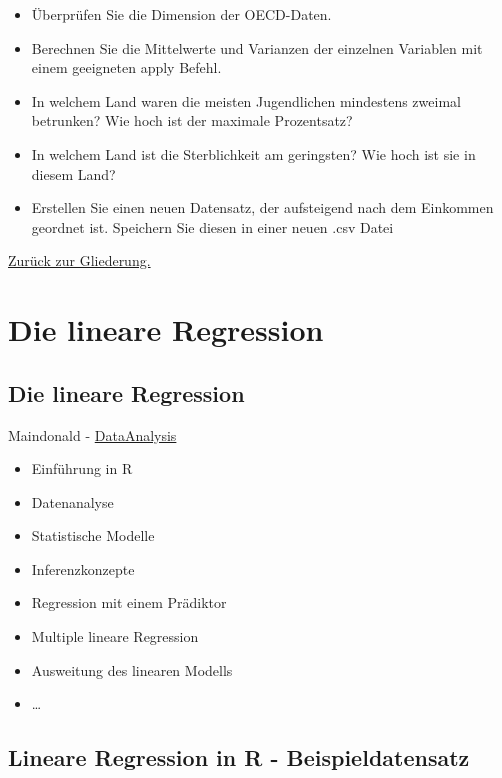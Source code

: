 \documentclass[]{article}
\providecommand{\tightlist}{%
  \setlength{\itemsep}{0pt}\setlength{\parskip}{0pt}}
\begin{document}
\begin{itemize}
\item
  Überprüfen Sie die Dimension der OECD-Daten.
\item
  Berechnen Sie die Mittelwerte und Varianzen der einzelnen Variablen
  mit einem geeigneten apply Befehl.
\item
  In welchem Land waren die meisten Jugendlichen mindestens zweimal
  betrunken? Wie hoch ist der maximale Prozentsatz?
\item
  In welchem Land ist die Sterblichkeit am geringsten? Wie hoch ist sie
  in diesem Land?
\item
  Erstellen Sie einen neuen Datensatz, der aufsteigend nach dem
  Einkommen geordnet ist. Speichern Sie diesen in einer neuen .csv Datei
\end{itemize}

\href{https://github.com/Japhilko/IntroR/blob/master/2017/README.md}{Zurück
zur Gliederung.}

\section{Die lineare Regression}\label{die-lineare-regression}

\subsection{Die lineare Regression}\label{die-lineare-regression-1}

Maindonald -
\href{https://cran.r-project.org/doc/contrib/usingR.pdf}{DataAnalysis}

\begin{itemize}
\tightlist
\item
  Einführung in R
\item
  Datenanalyse
\item
  Statistische Modelle
\item
  Inferenzkonzepte
\item
  Regression mit einem Prädiktor
\item
  Multiple lineare Regression
\item
  Ausweitung des linearen Modells
\item
  \ldots{}
\end{itemize}

\subsection{Lineare Regression in R -
Beispieldatensatz}\label{lineare-regression-in-r---beispieldatensatz}
\end{document}
